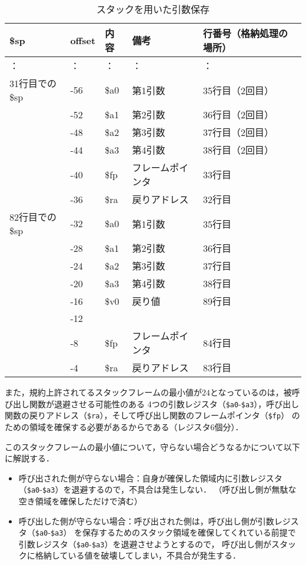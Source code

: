 \documentclass[a4j,11pt]{jarticle}
\begin{document}
\begin{table}[t]
      \centering
      \caption{スタックを用いた引数保存}
      \label{tbl:2-2}
      \begin{tabular}{|l|l|l|l|l|}
      \hline
      \$sp       & offset & 内容   & 備考       & 行番号（格納処理の場所） \\ \hline
：          & ：      & ：    & ：        & ：            \\ \hline
31行目での\$sp & -56    & \$a0 & 第1引数     & 35行目（2回目）    \\ \hline
           & -52    & \$a1 & 第2引数     & 36行目（2回目）    \\ \hline
           & -48    & \$a2 & 第3引数     & 37行目（2回目）    \\ \hline
           & -44    & \$a3 & 第4引数     & 38行目（2回目）    \\ \hline
           & -40    & \$fp & フレームポインタ & 33行目         \\ \hline
           & -36    & \$ra & 戻りアドレス   & 32行目         \\ \hline
82行目での\$sp & -32    & \$a0 & 第1引数     & 35行目         \\ \hline
           & -28    & \$a1 & 第2引数     & 36行目         \\ \hline
           & -24    & \$a2 & 第3引数     & 37行目         \\ \hline
           & -20    & \$a3 & 第4引数     & 38行目         \\ \hline
           & -16    & \$v0 & 戻り値      & 89行目         \\ \hline
           & -12    &      &          &              \\ \hline
           & -8     & \$fp & フレームポインタ & 84行目         \\ \hline
           & -4     & \$ra & 戻りアドレス   & 83行目         \\ \hline
      \end{tabular}
      \end{table}




また，規約上許されてるスタックフレームの最小値が$24$となっているのは，被呼び出し関数が退避させる可能性のある
4つの引数レジスタ（{{\tt \$a0}}-{{\tt \$a3}}），呼び出し関数の戻りアドレス（{{\tt \$ra}}），そして呼び出し関数のフレームポインタ（{{\tt \$fp}}）
のための領域を確保する必要があるからである（レジスタ6個分）．

このスタックフレームの最小値について，守らない場合どうなるかについて以下に解説する．
\begin{itemize}
      \item 呼び出された側が守らない場合：自身が確保した領域内に引数レジスタ（{{\tt \$a0}}-{{\tt \$a3}}）を退避するので，不具合は発生しない．
      （呼び出し側が無駄な空き領域を確保しただけで済む）
      \item 呼び出した側が守らない場合：呼び出された側は，呼び出し側が引数レジスタ（{{\tt \$a0}}-{{\tt \$a3}}）
      を保存するためのスタック領域を確保してくれている前提で引数レジスタ（{{\tt \$a0}}-{{\tt \$a3}}）を退避させようとするので，
      呼び出し側がスタックに格納している値を破壊してしまい，不具合が発生する．
\end{itemize}
\end{document}
